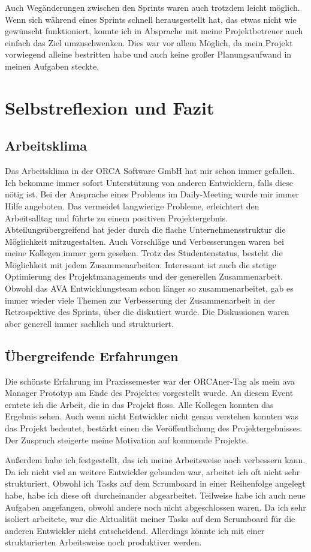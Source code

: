 Auch Wegänderungen zwischen den Sprints waren auch trotzdem leicht möglich. Wenn sich während eines Sprints schnell herausgestellt hat, das etwas nicht wie gewünscht funktioniert, konnte ich in Absprache mit meine Projektbetreuer auch einfach das Ziel umzuschwenken. Dies war vor allem Möglich, da mein Projekt vorwiegend alleine bestritten habe und auch keine großer Planungsaufwand in meinen Aufgaben steckte.

\chapter{Selbstreflexion und Fazit}

\section{Arbeitsklima}
Das Arbeitsklima in der ORCA Software GmbH hat mir schon immer gefallen. Ich bekomme immer sofort Unterstützung von anderen Entwicklern, falls diese nötig ist. Bei der Ansprache eines Problems im Daily-Meeting wurde mir immer Hilfe angeboten. Das vermeidet langwierige Probleme, erleichtert den Arbeitsalltag und führte zu einem positiven Projektergebnis. Abteilungsübergreifend hat jeder durch die flache Unternehmensstruktur die Möglichkeit mitzugestalten. Auch Vorschläge und Verbesserungen waren bei meine Kollegen immer gern gesehen. Trotz des Studentenstatus, besteht die Möglichkeit mit jedem Zusammenarbeiten. Interessant ist auch die stetige Optimierung des Projektmanagements und der generellen Zusammenarbeit. Obwohl das AVA Entwicklungsteam schon länger so zusammenarbeitet, gab es immer wieder viele Themen zur Verbesserung der Zusammenarbeit in der Retrospektive des Sprints, über die diskutiert wurde. Die Diskussionen waren aber generell immer sachlich und strukturiert. 

\section{Übergreifende Erfahrungen}
Die schönste Erfahrung im Praxissemester war der ORCAner-Tag als mein \ac{ava} Manager Prototyp am Ende des Projektes vorgestellt wurde. An diesem Event erntete ich die Arbeit, die in das Projekt floss. Alle Kollegen konnten das Ergebnis sehen. Auch wenn nicht Entwickler nicht genau verstehen konnten was das Projekt bedeutet, bestärkt einen die Veröffentlichung des Projektergebnisses. Der Zuspruch steigerte meine Motivation auf kommende Projekte.

Außerdem habe ich festgestellt, das ich meine Arbeitsweise noch verbessern kann.
Da ich nicht viel an weitere Entwickler gebunden war, arbeitet ich oft nicht sehr strukturiert. Obwohl ich Tasks auf dem Scrumboard in einer Reihenfolge angelegt habe, habe ich diese oft durcheinander abgearbeitet. Teilweise habe ich auch neue Aufgaben angefangen, obwohl andere noch nicht abgeschlossen waren. Da ich sehr isoliert arbeitete, war die Aktualität meiner Tasks auf dem Scrumboard für die anderen Entwickler nicht entscheidend. Allerdings könnte ich mit einer strukturierten Arbeitsweise noch produktiver werden.

